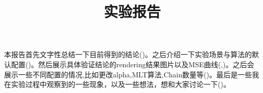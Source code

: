 \documentclass{article}
\date{}
\title{实验报告}
\begin{document}
\maketitle
\indent 本报告首先文字性总结一下目前得到的结论()。之后介绍一下实验场景与算法的默认配置()。然后展示具体验证结论的rendering结果图片以及MSE曲线(,)。之后会展示一些不同配置的情况,比如更改alpha,MLT算法,Chain数量等()。最后是一些我在实验过程中观察到的一些现象，以及一些想法，想和大家讨论一下()。




\clearpage

\clearpage

\clearpage

\end{document}
